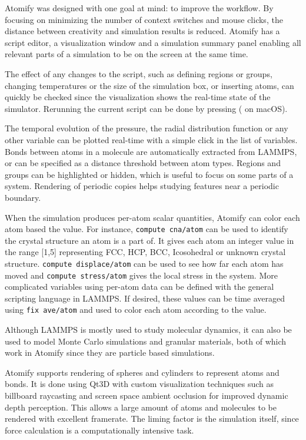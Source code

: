 \documentclass[12pt,a4paper,final]{iopart}
\newcommand{\code}[1]{\colorbox{light-gray}{\color{RawSienna}\texttt{#1}}}
\begin{document}
Atomify was designed with one goal at mind: to improve the workflow.
By focusing on minimizing the number of context switches and mouse clicks, 
the distance between creativity and simulation results is reduced. 
Atomify has a script editor, a visualization window and a simulation summary panel enabling all relevant parts
of a simulation to be on the screen at the same time.

The effect of any changes to the script, such as defining regions or groups,
changing temperatures or the size of the simulation box, or inserting atoms, can
quickly be checked since the visualization shows the real-time state of the simulator.
Rerunning the current script can be done by pressing  ( on macOS).

The temporal evolution of the pressure, the radial distribution function or any other
variable can be plotted real-time with a simple click in the list of variables.
Bonds between atoms in a molecule are automatically extracted from LAMMPS, or can
be specified as a distance threshold between atom types.
Regions and groups can be highlighted or hidden, which is useful to focus on some parts of a system.
Rendering of periodic copies helps studying features near a periodic boundary.

When the simulation produces per-atom scalar quantities, Atomify can color each atom based the value.
For instance, \code{compute cna/atom}\cite{faken1994systematic, tsuzuki2007structural} can be used to identify the crystal structure an atom is a part of.
It gives each atom an integer value in the range [1,5] representing FCC, HCP, BCC, Icosohedral or unknown crystal structure.
\code{compute displace/atom} can be used to see how far each atom has moved and \code{compute stress/atom} gives the local stress in the system.
More complicated variables using per-atom data can be defined with the general scripting language in LAMMPS.
If desired, these values can be time averaged using \code{fix ave/atom} and used to color each atom according to the value.

Although LAMMPS is mostly used to study molecular dynamics, it can also be used to
model Monte Carlo simulations\cite{frenkel2001understanding} and granular
materials\cite{brilliantov1996model, silbert2001granular, zhang2005jamming},
both of which work in Atomify since they are particle based simulations.

Atomify supports rendering of spheres and cylinders to represent atoms and bonds.
It is done using Qt3D with custom visualization techniques such as
billboard raycasting\cite{gumhold2003splatting, sigg2006gpu, tarini2006ambient} and screen space ambient occlusion\cite{bavoil2008screen}
for improved dynamic depth perception. This allows a large amount of atoms and molecules to be rendered with excellent framerate.
The liming factor is the simulation itself, since force calculation is a computationally intensive task.
\end{document}
